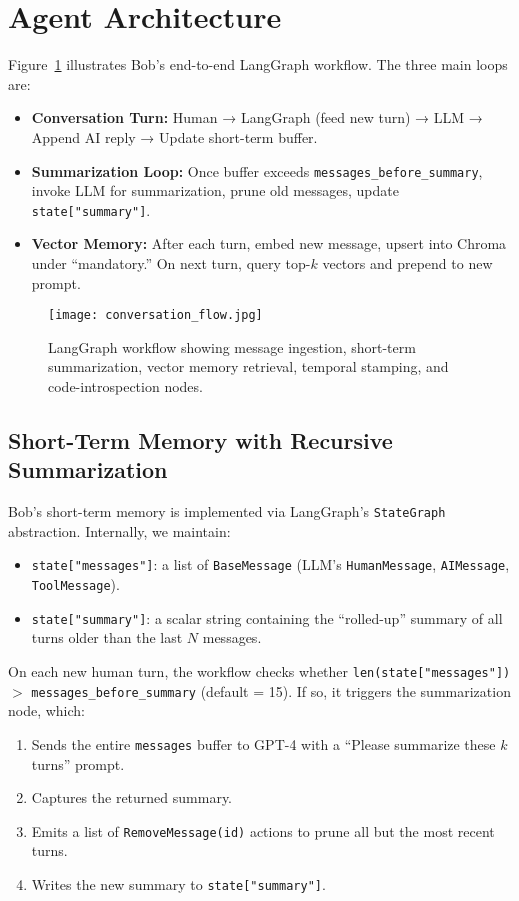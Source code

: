 \documentclass[11pt]{article}
\begin{document}
\section{Agent Architecture}
Figure~\ref{fig:workflow} illustrates Bob’s end-to-end LangGraph workflow. The three main loops are:
\begin{itemize}[leftmargin=*]
  \item \textbf{Conversation Turn:} Human → LangGraph (feed new turn) → LLM → Append AI reply → Update short-term buffer.
  \item \textbf{Summarization Loop:} Once buffer exceeds \texttt{messages\_before\_summary}, invoke LLM for summarization, prune old messages, update \texttt{state["summary"]}.
  \item \textbf{Vector Memory:} After each turn, embed new message, upsert into Chroma under “mandatory.” On next turn, query top-$k$ vectors and prepend to new prompt.
\end{itemize}

\begin{figure}[H]
  \centering
  \texttt{[image: conversation\_flow.jpg]}
  \caption{LangGraph workflow showing message ingestion, short-term summarization, vector memory retrieval, temporal stamping, and code-introspection nodes.}
  \label{fig:workflow}
\end{figure}

\subsection{Short-Term Memory with Recursive Summarization}
Bob’s short-term memory is implemented via LangGraph’s \texttt{StateGraph} abstraction. Internally, we maintain:
\begin{itemize}[leftmargin=*]
  \item \texttt{state["messages"]}: a list of \texttt{BaseMessage} (LLM’s \texttt{HumanMessage}, \texttt{AIMessage}, \texttt{ToolMessage}).
  \item \texttt{state["summary"]}: a scalar string containing the “rolled-up” summary of all turns older than the last $N$ messages.
\end{itemize}

On each new human turn, the workflow checks whether \texttt{len(state["messages"])} $>$ \texttt{messages\_before\_summary} (default = 15). If so, it triggers the summarization node, which:
\begin{enumerate}[leftmargin=*]
  \item Sends the entire \texttt{messages} buffer to GPT-4 with a “Please summarize these $k$ turns” prompt.
  \item Captures the returned summary.
  \item Emits a list of \texttt{RemoveMessage(id)} actions to prune all but the most recent turns.
  \item Writes the new summary to \texttt{state["summary"]}.
\end{enumerate}
\end{document}
